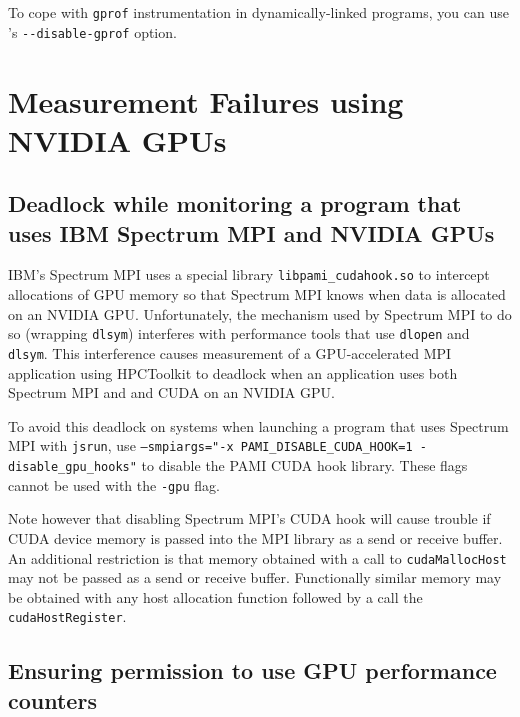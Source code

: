 \documentclass[11pt,twoside,letterpaper]{report}
\begin{document}
To cope with {\tt gprof} instrumentation in dynamically-linked programs, you can use \hpcrun{}'s \verb|--disable-gprof| option.


\section{Measurement Failures using NVIDIA GPUs}

\subsection{Deadlock while monitoring a program that uses IBM Spectrum MPI and NVIDIA GPUs}

IBM's Spectrum MPI uses a special library {\tt libpami\_cudahook.so} to intercept allocations of GPU memory so that Spectrum MPI knows when data is allocated on an NVIDIA GPU.
Unfortunately, the mechanism used by Spectrum MPI to do so (wrapping {\tt dlsym}) interferes with performance tools that use {\tt dlopen} and {\tt dlsym}.
This interference causes measurement of a GPU-accelerated MPI application using HPCToolkit to deadlock when an application uses both Spectrum MPI and and CUDA on an NVIDIA GPU.

To avoid this deadlock on systems when launching a program that uses Spectrum MPI with  {\tt jsrun}, use {\tt --smpiargs="-x PAMI\_DISABLE\_CUDA\_HOOK=1 -disable\_gpu\_hooks"} to disable the PAMI CUDA hook library.
These flags  cannot be used with the {\tt -gpu} flag.

Note however that disabling Spectrum MPI's CUDA hook will cause trouble if CUDA device memory is passed into the MPI library as a send or receive buffer.
An additional restriction is that memory obtained with a call to {\tt cudaMallocHost} may not be passed as a send or receive buffer.
Functionally similar memory may be obtained with any host allocation function followed by a call the {\tt cudaHostRegister}.


\subsection{Ensuring permission to use GPU performance counters}
\end{document}
